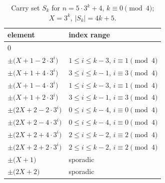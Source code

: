 \begin{table}[htbp]\centering\small
\caption{Carry set $S_k$ for $n=5\cdot 3^k + 4$, $k\equiv 0\pmod{4}$; $X=3^k$, $|S_k|=4k+5$.}
\begin{tabular}{ll}\toprule
element & index range \\ \midrule
$0$ & \\
$\pm\bigl(X + 1 - 2\cdot 3^i\bigr)$ & $1\le i\le k-3$, $i\equiv 1\pmod 4$ \\
$\pm\bigl(X + 1 + 4\cdot 3^i\bigr)$ & $3\le i\le k-1$, $i\equiv 3\pmod 4$ \\
$\pm\bigl(X + 1 - 4\cdot 3^i\bigr)$ & $1\le i\le k-3$, $i\equiv 1\pmod 4$ \\
$\pm\bigl(X + 1 + 2\cdot 3^i\bigr)$ & $3\le i\le k-1$, $i\equiv 3\pmod 4$ \\
$\pm\bigl(2X + 2 - 2\cdot 3^i\bigr)$ & $0\le i\le k-4$, $i\equiv 0\pmod 4$ \\
$\pm\bigl(2X + 2 - 4\cdot 3^i\bigr)$ & $0\le i\le k-4$, $i\equiv 0\pmod 4$ \\
$\pm\bigl(2X + 2 + 4\cdot 3^i\bigr)$ & $2\le i\le k-2$, $i\equiv 2\pmod 4$ \\
$\pm\bigl(2X + 2 + 2\cdot 3^i\bigr)$ & $2\le i\le k-2$, $i\equiv 2\pmod 4$ \\
$\pm\bigl(X + 1\bigr)$ & sporadic \\
$\pm\bigl(2X + 2\bigr)$ & sporadic \\
\bottomrule\end{tabular}\end{table}

